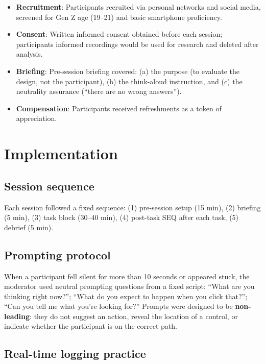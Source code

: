 \documentclass[conference]{IEEEtran}
\begin{document}
\begin{itemize}
  \item \textbf{Recruitment}: Participants recruited via personal networks and social media, screened
    for Gen Z age (19--21) and basic smartphone proficiency.
  \item \textbf{Consent}: Written informed consent obtained before each session; participants informed
    recordings would be used for research and deleted after analysis.
  \item \textbf{Briefing}: Pre-session briefing covered: (a) the purpose (to evaluate the design, not
    the participant), (b) the think-aloud instruction, and (c) the neutrality assurance (``there are
    no wrong answers'').
  \item \textbf{Compensation}: Participants received refreshments as a token of appreciation.
\end{itemize}

\section{Implementation}

\subsection{Session sequence}

Each session followed a fixed sequence: (1) pre-session setup (15 min), (2) briefing (5 min), (3) task
block (30--40 min), (4) post-task SEQ after each task, (5) debrief (5 min).

\subsection{Prompting protocol}

When a participant fell silent for more than 10 seconds or appeared stuck, the moderator used neutral
prompting questions from a fixed script: ``What are you thinking right now?''; ``What do you expect
to happen when you click that?''; ``Can you tell me what you're looking for?'' Prompts were designed
to be \textbf{non-leading}: they do not suggest an action, reveal the location of a control, or
indicate whether the participant is on the correct path.

\subsection{Real-time logging practice}
\end{document}
